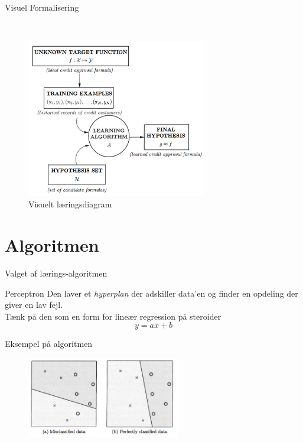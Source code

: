 \documentclass[12pt,t]{beamer}
\begin{document}
    \begin{frame}[c]{Visuel Formalisering}
        \begin{block}{~}
            \begin{figure}[h!]
                \caption{Visuelt læringsdiagram}
                \centering
                \includegraphics[width=0.7\textwidth]{include/dia.png}
            \end{figure}
        \end{block}
    \end{frame}


\section{Algoritmen}
\frame{\tableofcontents[currentsection]}

    \begin{frame}[t]{Valget af lærings-algoritmen}
        \begin{block}{Perceptron}
            Den laver et \emph{hyperplan} der adskiller data'en og finder en
            opdeling der giver en \alert{lav fejl}. \\
            \pause
            Tænk på den som en form for lineær regression på steroider
            $$
                y = ax + b
            $$
        \end{block}
        \pause
        \begin{block}{Eksempel på algoritmen}
            \begin{figure}[h!]
                \centering
                \includegraphics[width=0.6\textwidth]{include/per1.png}
            \end{figure}
        \end{block}
    \end{frame}
\end{document}
